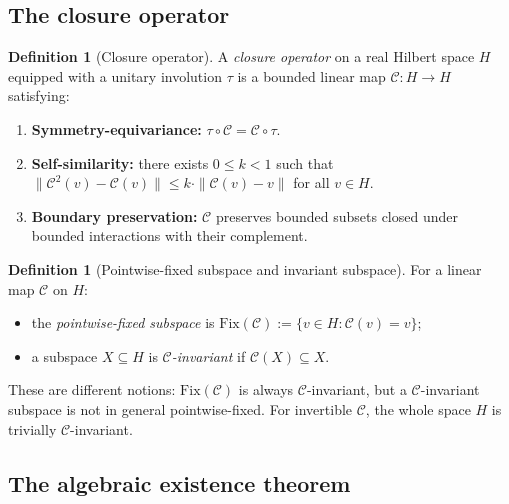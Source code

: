 \documentclass[11pt]{article}
\theoremstyle{plain}
\theoremstyle{definition}
\newtheorem{definition}[theorem]{Definition}
\theoremstyle{remark}
\newcommand{\Ccal}{\mathcal{C}}
\newcommand{\Fix}{\mathrm{Fix}}
\begin{document}
\subsection{The closure operator}

\begin{definition}[Closure operator]\label{def:closure}
A \emph{closure operator} on a real Hilbert space $H$ equipped with a unitary involution $\tau$ is a bounded linear map $\Ccal: H \to H$ satisfying:
\begin{enumerate}[leftmargin=2em]
\item \textbf{Symmetry-equivariance:} $\tau \circ \Ccal = \Ccal \circ \tau$.
\item \textbf{Self-similarity:} there exists $0 \leq k < 1$ such that $\|\Ccal^2(v) - \Ccal(v)\| \leq k \cdot \|\Ccal(v) - v\|$ for all $v \in H$.
\item \textbf{Boundary preservation:} $\Ccal$ preserves bounded subsets closed under bounded interactions with their complement.
\end{enumerate}
\end{definition}

\begin{definition}[Pointwise-fixed subspace and invariant subspace]\label{def:fixed-vs-invariant}
For a linear map $\Ccal$ on $H$:
\begin{itemize}[leftmargin=2em]
\item the \emph{pointwise-fixed subspace} is $\Fix(\Ccal) := \{ v \in H : \Ccal(v) = v \}$;
\item a subspace $X \subseteq H$ is \emph{$\Ccal$-invariant} if $\Ccal(X) \subseteq X$.
\end{itemize}
These are different notions: $\Fix(\Ccal)$ is always $\Ccal$-invariant, but a $\Ccal$-invariant subspace is not in general pointwise-fixed. For invertible $\Ccal$, the whole space $H$ is trivially $\Ccal$-invariant.
\end{definition}

\subsection{The algebraic existence theorem}
\end{document}
